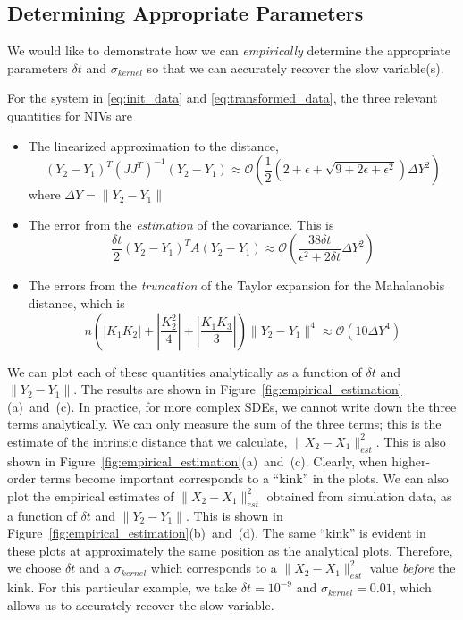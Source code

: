 \documentclass[1p]{elsarticle}
\begin{document}
\subsection{Determining Appropriate Parameters}

We would like to demonstrate how we can {\em empirically} determine the appropriate parameters $\delta t$ and $\sigma_{kernel}$ so that we can accurately recover the slow variable(s).

For the system in \eqref{eq:init_data} and \eqref{eq:transformed_data}, the three relevant quantities for NIVs are 
\begin{itemize}
\item The linearized approximation to the distance,
%
\begin{equation}
(Y_2 - Y_1)^T (JJ^T)^{-1} (Y_2 - Y_1) 
\approx \mathcal{O} \left(  \frac{1}{2} \left( 2 + \epsilon + \sqrt{ 9 + 2 \epsilon + \epsilon^2}\right) \Delta Y^2\right) 
\end{equation}
where $\Delta Y =  \|Y_2 - Y_1\|$

\item The error from the {\em estimation} of the covariance.
%
This is
\begin{equation}
\frac{\delta t}{2} (Y_2 - Y_1)^T A (Y_2 - Y_1) \approx \mathcal{O} \left( \frac{38 \delta t}{\epsilon ^2 + 2 \delta t}\Delta Y^2 \right)
\end{equation}

\item The errors from the {\em truncation} of the Taylor expansion for the Mahalanobis distance, which is 
\begin{equation}
n \left( \left| K_1 K_2 \right| + \left| \frac{ K_2^2}{4} \right|  + \left| \frac{K_1 K_3}{3} \right|  \right) \| Y_2 - Y_1 \| ^4 \approx \mathcal{O} \left( 10 \Delta Y^4  \right) 
\end{equation}

\end{itemize}
%
We can plot each of these quantities analytically as a function of $\delta t$ and $\|Y_2 - Y_1\|$. 
%
The results are shown in Figure~\ref{fig:empirical_estimation}(a)~and~(c). 
%
In practice, for more complex SDEs, we cannot write down the three terms analytically.
%
We can only measure the sum of the three terms; this is the estimate of the intrinsic distance that we calculate, $\|X_2 - X_1 \|^2_{est}$.
%
This is also shown in Figure~\ref{fig:empirical_estimation}(a)~and~(c).
%
Clearly, when higher-order terms become important corresponds to a ``kink'' in the plots. 
%
We can also plot the empirical estimates of $\| X_2 - X_1 \|^2_{est}$ obtained from simulation data, as a function of $\delta t$ and $\| Y_2 - Y_1 \|$.
%
This is shown in Figure~\ref{fig:empirical_estimation}(b)~and~(d). 
%
The same ``kink'' is evident in these plots at approximately the same position as the analytical plots. 
%
Therefore, we choose $\delta t$ and a $\sigma_{kernel}$ which corresponds to a $\|X_2 - X_1 \|_{est}^2$ value {\em before} the kink. 
%
For this particular example, we take $\delta t = 10^{-9}$ and $\sigma_{kernel} = 0.01$, which allows us to accurately recover the slow variable. 
\end{document}
